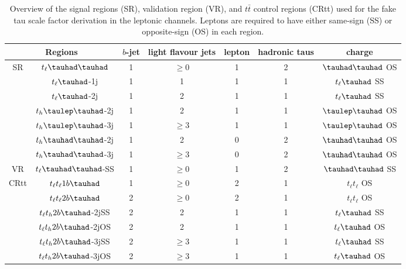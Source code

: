 \documentclass[PAPER, coverpage, atlasdraft=true, texlive=2016, UKenglish]{\ATLASLATEXPATH atlasdoc} %
\begin{document}
\begin{table}
\centering
\caption{Overview of the signal regions (SR), validation region (VR), and $t\bar{t}$ control regions (CRtt) used for the fake tau scale factor derivation in the leptonic channels. Leptons are required to have either same-sign (SS) or opposite-sign (OS) in each region.}
\label{tab:srcr}
\begin{tabular}[h]{c|c|c|c|c|c|c}
\hline \hline
\multicolumn{2}{c|}{Regions} & $b$-jet & light flavour jets        & lepton & hadronic taus & charge\\ \hline
\multirow{7}{*}{SR}&$t_{\ell}\thadhad$     & 1     & $\ge0$                                & 1      & 2             & $\thadhad$ OS\\ \cline{2-7}
&$t_{\ell}\tauhad$-1j  & 1     & 1                                   & 1      & 1                     & $t_{\ell}\tauhad$ SS\\ \cline{2-7}
&$t_{\ell}\tauhad$-2j  & 1     & 2                                        & 1      & 1                     & $t_{\ell}\tauhad$ SS\\ \cline{2-7}
&$t_h\tlhad$-2j   & 1     & 2                           & 1      & 1             & $\tlhad$ OS\\ \cline{2-7}
&$t_h\tlhad$-3j   & 1     & $\ge3$                      & 1      & 1             & $\tlhad$ OS\\ \cline{2-7}
&$t_h\thadhad$-2j & 1     & 2                            & 0      & 2             & $\thadhad$ OS\\ \cline{2-7}
&$t_h\thadhad$-3j & 1     & $\ge3$                       & 0      & 2             & $\thadhad$ OS\\ \hline
VR &$t_{\ell}\thadhad$-SS     & 1     & $\ge0$                                & 1      & 2             & $\thadhad$ SS\\ \hline
\multirow{6}{*}{CRtt}&$t_{\ell}t_{\ell}1b\tauhad$ & 1     & $\ge0$                            & 2      & 1                     & $t_{\ell}t_{\ell}$ OS\\ \cline{2-7}
&$t_{\ell}t_{\ell}2b\tauhad$      & 2     & $\ge0$                            & 2      & 1                     & $t_{\ell}t_{\ell}$ OS\\ \cline{2-7}
&$t_{\ell}t_h2b\tauhad$-2jSS & 2     & 2                             & 1      & 1             & $t_{\ell}\tauhad$ SS\\ \cline{2-7}
&$t_{\ell}t_h2b\tauhad$-2jOS & 2     & 2                             & 1      & 1             & $t_{\ell}\tauhad$ OS\\ \cline{2-7}
&$t_{\ell}t_h2b\tauhad$-3jSS & 2     & $\ge3$                        & 1      & 1             & $t_{\ell}\tauhad$ SS\\ \cline{2-7}
&$t_{\ell}t_h2b\tauhad$-3jOS & 2     & $\ge3$                & 1      & 1             & $t_{\ell}\tauhad$ OS\\ \hline
\end{tabular}
\end{table}
\end{document}
